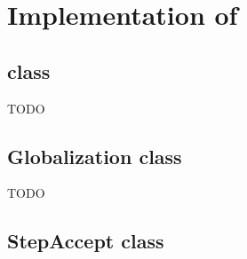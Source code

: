 \section{Implementation of \solvername{}}
\label{S:implementation}



\subsection{\solvername{} class}

TODO


\clearpage

\subsection{Globalization class}

TODO



\clearpage

\subsection{StepAccept class}

